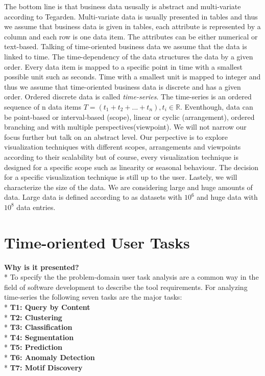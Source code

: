 The bottom line is that business data ususally is abstract and multi-variate according to Tegarden\cite{tegarden1999}. Multi-variate data is usually presented in tables\cite{Borgo2013} and thus we assume that business data is given in tables, each attribute is represented by a column and each row is one data item. The attributes can be either numerical or text-based. 
Talking of time-oriented business data we assume that the data is linked to time. The time-dependency of the data structures the data by a given order. Every data item is mapped to a specific point in time with a smallest possible unit such as seconds. Time with a smallest unit is mapped to integer\cite{Aigner2011} and thus we assume that time-oriented business data is discrete and has a given order. Ordered discrete data is called \textit{time-series}. The time-series is an ordered sequence of n data items $T=(t_1+t_2+...+t_n),t_i\in\mathbb{R}$. Eventhough, data can be point-based or interval-based (scope), linear or cyclic (arrangement), ordered branching and with multiple perspectives(viewpoint)\cite{Aigner2011}. We will not narrow our focus further but talk on an abstract level. Our perpective is to explore visualization techniques with different scopes, arrangements and viewpoints according to their scalability but of course, every visualization technique is designed for a specific scope such as linearity or seasonal behaviour. The decision for a specific visualization technique is still up to the user. 
Lastely, we will characterize the size of the data. We are considering large and huge amounts of data. Large data is defined according to\cite{Huber1994} as datasets with $10^6$ and huge data with $10^8$ data entries.


\section{Time-oriented User Tasks}
\textbf{Why is it presented?}\\*
To specify the the problem-domain user task analysis are a common way in the field of software development to describe the tool requirements\cite{Aigner2011}.
For analyzing time-series the following seven tasks are the major tasks\cite{Esling2012}:
\\*
\textbf{T1: Query by Content}
\\*
\textbf{T2: Clustering}
\\*
\textbf{T3: Classification}
\\*
\textbf{T4: Segmentation}
\\*
\textbf{T5: Prediction}
\\*
\textbf{T6: Anomaly Detection}
\\*
\textbf{T7: Motif Discovery}

